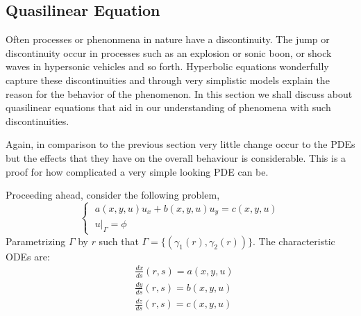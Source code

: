 \documentclass[11pt, a4paper]{report}
\begin{document}
\subsection{Quasilinear Equation}
Often processes or phenonmena in nature have a discontinuity. The jump or discontinuity occur in processes such as 
an explosion or sonic boon, or shock waves in hypersonic vehicles and so forth. Hyperbolic equations wonderfully 
capture these discontinuities and through very simplistic models explain the reason for the behavior of the phenomenon. 
In this section we shall discuss about quasilinear equations that aid in our understanding of phenomena with such
discontinuities. 

Again, in comparison to the previous section very little change occur to the PDEs but the effects that they have on
the overall behaviour is considerable. This is a proof for how complicated a very simple looking PDE can be.

Proceeding ahead, consider the following problem,
\begin{equation*}
    \begin{cases}
        \; a(x, y, u)u_x + b(x, y, u)u_y = c(x, y, u)\\[-0.5em] %
        \; u|_\Gamma = \phi
    \end{cases}
\end{equation*}
Parametrizing $\Gamma$ by $r$ such that $\Gamma = \{(\gamma_1(r), \gamma_2(r))\}$. The characteristic ODEs are:
\begin{equation*}
    \begin{aligned}
        & \frac {dx}{ds}(r, s) = a(x, y, u)\\
        & \frac {dy}{ds}(r, s) = b(x, y, u)\\
        & \frac {dz}{ds}(r, s) = c(x, y, u)
    \end{aligned}
\end{equation*}
\end{document}
